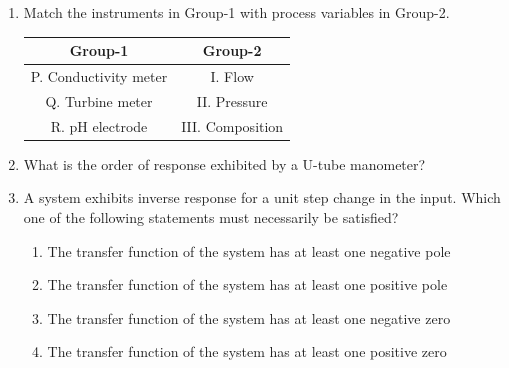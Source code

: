 \documentclass[journal,12pt,onecolumn]{IEEEtran}
\theoremstyle{remark}
\begin{document}
\begin{enumerate}
\item Match the instruments in Group-1 with process variables in Group-2.
\begin{center}
\begin{tabular}{c|c}
Group-1 & Group-2 \\
\hline
P. Conductivity meter & I. Flow \\
Q. Turbine meter & II. Pressure \\
R. pH electrode & III. Composition \\
\end{tabular}
\end{center}
\hfill{}
\begin{enumerate}
\end{enumerate}

\item What is the order of response exhibited by a U-tube manometer?
\hfill{}
\begin{enumerate}
\end{enumerate}

\item A system exhibits inverse response for a unit step change in the input. Which one of the following statements must necessarily be satisfied?
\hfill{}
\begin{enumerate}
\item The transfer function of the system has at least one negative pole
\item The transfer function of the system has at least one positive pole
\item The transfer function of the system has at least one negative zero
\item The transfer function of the system has at least one positive zero
\end{enumerate}


\end{enumerate}
\end{document}
